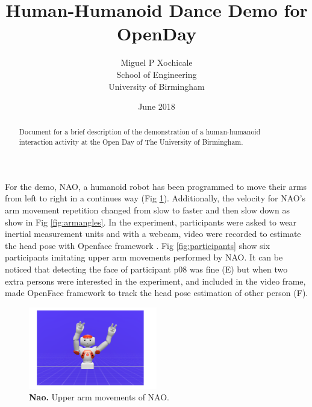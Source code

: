 \documentclass[12pt]{article}
\title{Human-Humanoid Dance Demo for OpenDay}
\author{Miguel P Xochicale \\ 
School of Engineering \\
University of Birmingham
}
\date{June 2018}
\begin{document}
\maketitle


\begin{abstract}
Document for a brief description of the demonstration of a human-humanoid 
interaction activity at the Open Day of The University of Birmingham.
\end{abstract}

For the demo, NAO, a humanoid robot \cite{gouaillier2008} has been programmed 
to move their arms from left to right in a continues way (Fig \ref{fig:nao}).
Additionally, the velocity for NAO's arm movement repetition changed from slow to faster 
and then slow down as show in Fig \ref{fig:armangles}.
In the experiment, participants were asked to wear inertial measurement units
and with a webcam, video were recorded to estimate the head pose with Openface framework 
\cite{baltrusaitis2016, baltrusaitis2018}.
Fig \ref{fig:participants} show six participants imitating upper arm movements
performed by NAO. It can be noticed that detecting the face of participant p08 was fine (E)
but when two extra persons were interested in the experiment, and included in the video frame,  
made OpenFace framework to track the head pose estimation of other person (F).


\begin{figure}[!ht]
\centering
\includegraphics[width=0.5\textwidth]{nao/naoarms}
    \caption{
	{\bf Nao.}
	 Upper arm movements of NAO.
        }
\label{fig:nao}
\end{figure}
\end{document}
